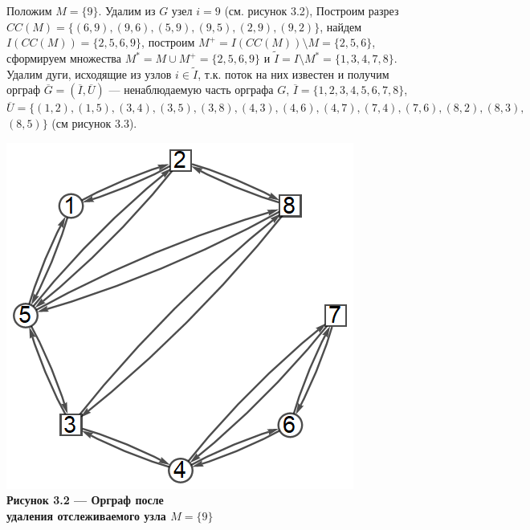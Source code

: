 \documentclass[14pt]{extarticle}%
\begin{document}
Положим $M=\{9\}$. Удалим из $G$ узел $i=9$ (см. рисунок 3.2), Построим разрез $CC(M)=\{(6,9),(9,6),(5,9),(9,5),(2,9),(9,2)\}$, найдем $I(CC(M))=\{2,5,6,9\}$, построим $M^+=I(CC(M))\setminus M=\{2,5,6\}$, сформируем множества $M^*=M\cup M^+=\{2,5,6,9\}$ и $\widetilde{I}=I\setminus M^*=\{1,3,4,7,8\}$. Удалим дуги, исходящие из узлов $i\in \widetilde{I}$, т.к. поток на них известен и получим орграф $\overline{G}=(\overline{I},\overline{U})$ --- ненаблюдаемую часть орграфа $G$, $\overline{I}=\{1,2,3,4,5,6,7,8\}$,\\ $\overline{U}=\{(1,2),(1,5),(3,4),(3,5),(3,8),(4,3),(4,6),(4,7),(7,4),(7,6),(8,2),(8,3),$ \\ $(8,5)\}$ (см рисунок 3.3).
\begin{center}
\includegraphics[scale=0.6]{grs/s1g1.png}\\
\textbf{Рисунок 3.2 --- Орграф после \\удаления отслеживаемого узла $M=\{9\}$}
\end{center}
\end{document}
